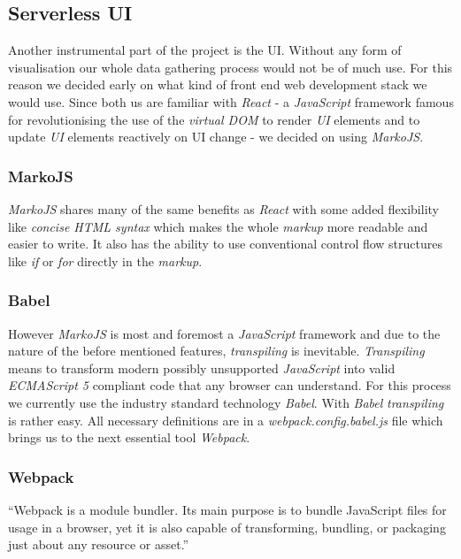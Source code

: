 \subsection{Serverless UI}

Another instrumental part of the project is the UI. Without any form of visualisation our whole data
gathering process would not be of much use. For this reason we decided early on what kind of front
end web development stack we would use. Since both us are familiar with \textit{React} - a
\textit{JavaScript} framework famous for revolutionising the use of the \textit{virtual DOM}
to render \textit{UI} elements and to update \textit{UI} elements reactively on
UI change - we decided on using \textit{MarkoJS}.

\subsubsection{MarkoJS}

\textit{MarkoJS} shares many of the same benefits as \textit{React} with some added flexibility like
\textit{concise HTML syntax} which makes the whole \textit{markup} more readable and easier to
write. It also has the ability to use conventional control flow structures like \textit{if} or
\textit{for} directly in the \textit{markup}.

\subsubsection{Babel}

However \textit{MarkoJS} is most and foremost a \textit{JavaScript} framework and due to the nature
of the before mentioned features, \textit{transpiling} is inevitable. \textit{Transpiling} means to
transform modern possibly unsupported \textit{JavaScript} into valid \textit{ECMAScript 5} compliant
code that any browser can understand. For this process we currently use the industry standard
technology \textit{Babel}. With \textit{Babel} \textit{transpiling} is rather easy. All necessary
definitions are in a \textit{webpack.config.babel.js} file which brings us to the next essential
tool \textit{Webpack}.

\subsubsection{Webpack}

“Webpack is a module bundler. Its main purpose is to bundle JavaScript files for usage in a browser,
yet it is also capable of transforming, bundling, or packaging just about any resource or asset.”
\cite{webpack}


